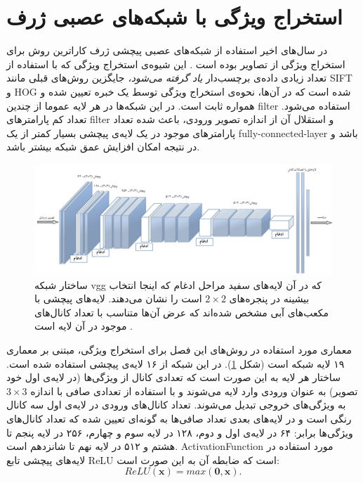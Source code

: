 \section{استخراج ویژگی با شبکه‌های عصبی ژرف}\label{cnns}
 در سال‌های اخیر استفاده از شبکه‌های عصبی پیچشی ژرف کاراترین روش برای استخراج ویژگی از تصاویر بوده است \cite{Oquab2014}. این شیوه‌ی استخراج ویژگی که با استفاده از تعداد زیادی داده‌ی برچسب‌دار
\textit{یاد گرفته می‌شود،}
جایگزین روش‌های قبلی مانند SIFT و HOG شده است که در آن‌ها، نحوه‌ی استخراج ویژگی توسط یک خبره تعیین شده و همواره ثابت است.
 در این شبکه‌ها در هر لایه عموما از چندین \gls{filter} استفاده می‌شود. تعداد کم پارامترهای \gls{filter} و استقلال آن از اندازه تصویر ورودی، باعث شده تعداد پارامتر‌های موجود در یک لایه‌ی پیچشی بسیار کمتر از یک \gls{fully-connected-layer} باشد و در نتیجه امکان افزایش عمق شبکه بیشتر باشد.
\begin{figure}[!t]
\centering
\includegraphics[width=1.1\linewidth]{images/vgg}
\caption[ساختار شبکه استخراج ویژگی]{
ساختار شبکه vgg که در آن لایه‌های سفید مراحل ادغام که اینجا انتخاب بیشینه در پنجره‌های $2 \times 2$ است را نشان می‌دهند.
لایه‌های پیچشی با مکعب‌های آبی مشخص شده‌اند که عرض آن‌ها متناسب با تعداد کانال‌های موجود در آن لایه است \cite{el2016face}.
}
\label{fig:vgg}
\end{figure}
معماری مورد استفاده در روش‌های این فصل برای استخراج ویژگی، مبتنی بر معماری ۱۹ لایه شبکه  \cite{vgg} است (شکل \ref{fig:vgg}). در این شبکه از ۱۶ لایه‌ی پیچشی استفاده شده است. ساختار هر لایه به این صورت است که تعدادی کانال از ویژگی‌ها (در لایه‌ی اول  خود تصویر) به عنوان ورودی وارد لایه می‌شوند و با استفاده از تعدادی صافی با اندازه $3 \times 3$ به ویژگی‌های خروجی تبدیل می‌شوند. تعداد کانال‌های ورودی در لایه‌ی اول سه کانال رنگی  است و در لایه‌های بعدی تعداد صافی‌ها به گونه‌ای تعیین شده که تعداد کانال‌های ویژگی‌ها برابر: ۶۴ در لایه‌ی اول و دوم، ۱۲۸ در لایه‌ سوم و چهارم، ۲۵۶ در لایه پنجم تا هشتم و ۵۱۲ در لایه نهم تا شانزدهم است. \gls{ActivationFunction} مورد استفاده در لایه‌های پیچشی تابع \gls{ReLU} است که ضابطه آن به این صورت است:
\begin{equation}
ReLU(\mathbf{x}) = max(\mathbf{0,x}).
\end{equation}

